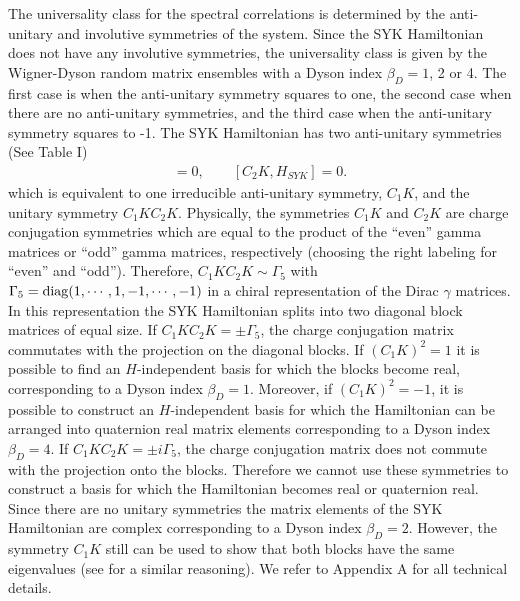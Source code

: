 \documentclass[aps,showpacs,floatfix,superscriptaddress,pre,11pt]{revtex4-1}
\newcommand{\be}{\begin{eqnarray}}
\newcommand{\ee}{\end{eqnarray}}
\begin{document}
  The universality class for the spectral correlations is determined by the anti-unitary and involutive
  symmetries  of the system. Since the SYK Hamiltonian does not have any involutive symmetries, the
  universality class is given by the Wigner-Dyson random matrix ensembles with a Dyson index
  $\beta_D = 1$, 2 or 4. The first case is when the anti-unitary symmetry squares to one, the
  second case when there are no anti-unitary symmetries, and the third case when the anti-unitary
  symmetry squares to -1. The SYK Hamiltonian has two anti-unitary symmetries (See Table I)
  \be
     [C_1K, H_{SYK}] = 0, \qquad  [C_2K, H_{SYK}] = 0.
     \ee
     which is equivalent to one irreducible anti-unitary symmetry, $C_1 K$, and the unitary symmetry
     $C_1 K C_2 K$. Physically, the symmetries $C_1K$ and  $C_2K$ are charge conjugation symmetries which are equal
     to the product of the ``even'' gamma  matrices or ``odd'' gamma matrices, respectively (choosing
     the right labeling for ``even'' and ``odd''). Therefore,  $C_1 K C_2 K \sim \Gamma_5$ with
     $\Gamma_5={\rm diag}(1,\cdots,1,-1,\cdots,-1)$ in a chiral representation of the Dirac
     $\gamma$ matrices. In this representation the SYK Hamiltonian splits into two diagonal block matrices
     of equal size.
     If $C_1 K C_2 K=\pm\Gamma_5$, the charge conjugation matrix commutates with the projection on
     the diagonal blocks. If $(C_1K)^2 = 1$ it is possible \cite{porter} to find an $H$-independent basis for which the
     blocks become real, corresponding to a Dyson index $\beta_D = 1$. Moreover, if $(C_1K)^2 = -1$,
     it is possible to construct an $H$-independent basis for which the Hamiltonian can be arranged into
     quaternion real matrix elements corresponding to a Dyson index $\beta_D = 4$. %
     If $C_1 K C_2 K=\pm i \Gamma_5$,
     the charge conjugation matrix does not commute with the projection onto
     the blocks. Therefore we cannot use these symmetries to construct a basis for which the Hamiltonian becomes
     real or quaternion real. Since there are no unitary symmetries the matrix elements of the SYK Hamiltonian
     are complex corresponding to a Dyson index $\beta_D = 2$. However, the symmetry $C_1K$ still can be
     used to show that both blocks have the same eigenvalues (see \cite{kieburg2015} for a similar reasoning).
     We refer to Appendix A for all technical details.
      
\end{document}
